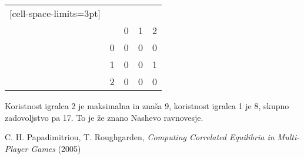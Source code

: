 \documentclass{article}
\begin{document}
\noindent
\begin{minipage}[t]{0.2\textwidth}
    \begin{NiceTabular}{ccccc}[cell-space-limits=3pt]
        &     &  & \\
        &     & 0     & 1 & 2 \\
        & 0 & 
              0 & 0 & 0\\
        & 1 & 0 & 0 & 1 \\
        & 2 &  0  & 0    & 0 \\
    \end{NiceTabular}
\end{minipage}%
\hfill
\begin{minipage}[t]{0.7\textwidth}
Koristnost igralca 2 je maksimalna in znaša 9, koristnost igralca 1 je 8, skupno zadovoljstvo pa 17. To je že znano Nashevo ravnovesje.
\end{minipage}
\vspace{0.5cm}



\begin{thebibliography}{99}

     C. H. Papadimitriou, T. Roughgarden, \emph{Computing Correlated Equilibria in Multi-Player Games} (2005)


\end{thebibliography}
\end{document}
